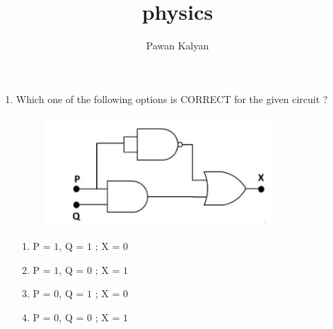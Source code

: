 \documentclass{article}
\begin{document}
\title{physics}
\author{Pawan Kalyan}
\maketitle
\begin{enumerate}
	\item Which one of the following options is CORRECT for the given circuit ?
		\begin{figure}[h]
			\centering
			\includegraphics[width=\columnwidth]{FIG/Q24.jpg}
		\end{figure}

		\begin{enumerate}[label=(\Alph*)]
		\item P = $1$, Q = $1$ ; X = $0$
		\item P = $1$, Q = $0$ ; X = $1$
		\item P = $0$, Q = $1$ ; X = $0$
		\item P = $0$, Q = $0$ ; X = $1$
	\end{enumerate}
\end{enumerate}
\end{document}
